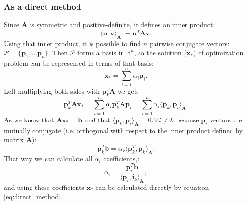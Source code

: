 \subsubsection{As a direct method} Since $\mathbf{A}$ is symmetric and positive-definite, it defines an inner product:
\[\langle \mathbf{u}, \mathbf{v} \rangle_\mathbf{A} := \mathbf{u}^T\mathbf{Av}.\]
Using that inner product, it is possible to find $n$ pairwise conjugate vectors: $\mathcal{P} = \{\mathbf{p}_1,...\mathbf{p}_n\}$. Then $\mathcal{P}$ forms a basis in $\mathbb{R}^n$, so the solution ($\mathbf{x_*}$) of optimization problem can be represented in terms of that basis:
\begin{equation} \label{eq:direct_method}
    \mathbf{x_*} = \sum_{i=1}^{n} \alpha_i \mathbf{p}_i.
\end{equation}
Left multiplying both sides with $\mathbf{p}_k^T \mathbf{A}$ we get:
\[\mathbf{p}_k^T\mathbf{Ax_*} = \sum_{i=1}^{n} \alpha_i \mathbf{p}_k^T \mathbf{A} \mathbf{p}_i = \sum_{i=1}^{n} \alpha_i \langle \mathbf{p}_k, \mathbf{p}_i \rangle_\mathbf{A}.\]
As we know that $\mathbf{Ax_*} = \mathbf{b}$ and that $\langle \mathbf{p}_k, \mathbf{p}_i \rangle_\mathbf{A} = 0 : \forall i \ne k $  because $\mathbf{p}_i$ vectors are mutually conjugate (i.e. orthogonal with respect to the inner product defined by matrix $\mathbf{A}$):
\[\mathbf{p}_k^T\mathbf{b} = \alpha_k \langle \mathbf{p}_k^T, \mathbf{p}_k \rangle_\mathbf{A}.\]
That way we can calculate all $\alpha_i$ coefficients,:
\[\alpha_i = \frac{\mathbf{p}_i^T\mathbf{b}}{\langle \mathbf{p}_i, \mathbf{i}_k \rangle_\mathbf{A}},\]
and using these coefficients $\mathbf{x_*}$ can be calculated directly by equation \ref{eq:direct_method}.


